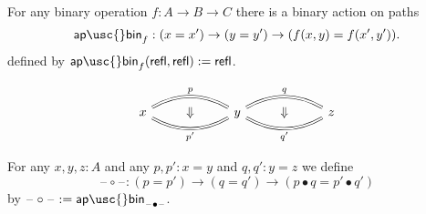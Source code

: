 \documentclass[handout]{beamer}
\newcommand{\apbinary}{\mathsf{ap\usc{}bin}}
\newcommand{\refl}{\mathsf{refl}}
\newcommand{\blank}{\mathord{\hspace{1pt}\text{--}\hspace{1pt}}}
\begin{document}
\begin{frame}
  \begin{definition}
    For any binary operation $f:A\to B\to C$ there is a binary action on paths
    \begin{equation*}
      \apbinary_f:(x=x')\to (y=y')\to (f(x,y)=f(x',y')).
    \end{equation*}
    defined by $\apbinary_f(\refl,\refl):=\refl$.
  \end{definition}\pause

  \begin{equation*}
    \begin{tikzcd}[ampersand replacement=\&,column sep=6em]
      x \arrow[r,bend left=30,equals,"p",""{name=A,below}]
        \arrow[r,bend right=30,equals,swap,"{p'}",""{name=B,above}]
      \&
      y \arrow[r,bend left=30,equals,"q",""{name=C,below}]
        \arrow[r,bend right=30,equals,"{q'}"',""{name=D,above}]
      \&
      z
      \arrow[from=A,to=B,phantom,"\Downarrow"]
      \arrow[from=C,to=D,phantom,"\Downarrow"]
    \end{tikzcd}
  \end{equation*}\pause

  \begin{definition}
    For any $x,y,z:A$ and any $p,p':x=y$ and $q,q':y=z$ we define
    \begin{equation*}
      \blank\circ\blank : (p=p')\to (q=q')\to (p \bullet q=p' \bullet q')
    \end{equation*}
    by $\blank\circ\blank := \apbinary_{\blank\bullet\blank}$. 
  \end{definition}
\end{frame}
\end{document}
